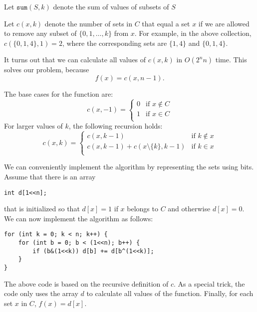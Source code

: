 Let $\texttt{sum}(S,k)$ denote the sum of
values of subsets of $S$


Let $c(x,k)$ denote the number of sets in
$C$ that equal a set $x$
if we are allowed to remove any subset of
$\{0,1,\ldots,k\}$ from $x$.
For example, in the above collection,
$c(\{0,1,4\},1)=2$,
where the corresponding sets are
$\{1,4\}$ and $\{0,1,4\}$.

It turns out that we can calculate all
values of $c(x,k)$ in $O(2^n n)$ time.
This solves our problem, because
\[f(x)=c(x,n-1).\]

The base cases for the function are:
\begin{equation*}
    c(x,-1) = \begin{cases}
               0 & \textrm{if $x \notin C$}\\
               1 & \textrm{if $x \in C$}\\
           \end{cases}
\end{equation*}
For larger values of $k$, the following recursion holds:
\begin{equation*}
    c(x,k) = \begin{cases}
               c(x,k-1)          & \textrm{if $k \notin x$}\\
               c(x,k-1)+c(x \setminus \{k\},k-1)    & \textrm{if $k \in x$}\\
           \end{cases}
\end{equation*}

We can conveniently implement the algorithm by representing
the sets using bits.
Assume that there is an array
\begin{lstlisting}
int d[1<<n];
\end{lstlisting}
that is initialized so that $d[x]=1$ if $x$ belongs to $C$
and otherwise $d[x]=0$.
We can now implement the algorithm as follows:

\begin{lstlisting}
for (int k = 0; k < n; k++) {
    for (int b = 0; b < (1<<n); b++) {
        if (b&(1<<k)) d[b] += d[b^(1<<k)];
    }
}
\end{lstlisting}
The above code is based on the recursive definition
of $c$. As a special trick, the code only uses
the array $d$ to calculate all values of the function.
Finally, for each set $x$ in $C$, $f(x)=d[x]$.

